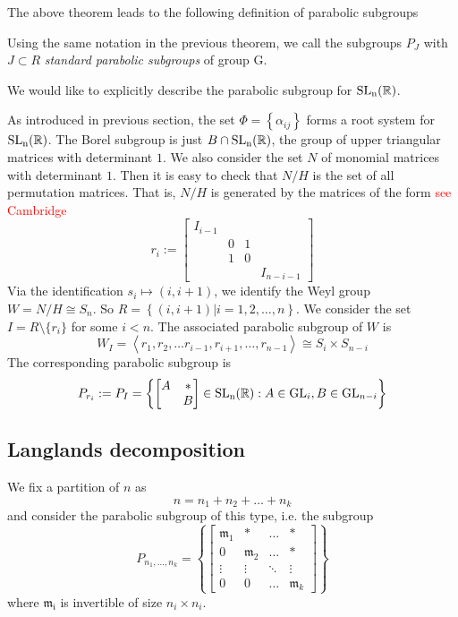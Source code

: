 The above theorem leads to the following definition of parabolic subgroups
\begin{definition}
    Using the same notation in the previous theorem, we call the subgroups $P_J$ with $J \subset R$  \textit{standard parabolic subgroups} of group G.
\end{definition}
We would like to explicitly describe the parabolic subgroup for $\operatorname{\text{SL}_n(\mathbb{R})}$.
\begin{example}
    As introduced in previous section, the set $\Phi = \left\lbrace \alpha_{ij}\right\rbrace $ forms a
    root system for $\operatorname{\text{SL}_n(\mathbb{R})}$. The Borel subgroup is just $B \cap \operatorname{\text{SL}_n(\mathbb{R})}$, the group of upper triangular matrices with determinant $1$.
    We also consider the set $N$ of monomial matrices  with determinant $1$. Then it is easy to check that
    $N/H$ is the set of all permutation matrices. That is, $N/H$ is generated by the
    matrices of the form \textcolor{red}{see Cambridge}
    \[r_i := \begin{bmatrix}
            I_{i-1} &   &   &           \\
                    & 0 & 1 &           \\
                    & 1 & 0 &           \\
                    &   &   & I_{n-i-1}
        \end{bmatrix}\]
    Via the identification $s_i \mapsto (i,i+1)$, we identify  the Weyl group $W = N/H \cong S_n$. So
    $R = \left\lbrace (i,i+1)| i = 1,2,\ldots,n\right\rbrace $. We consider the set
    $I = R \setminus \{r_i\}$ for some $i<n$. The associated parabolic subgroup of
    $W$ is
    \[W_I = \left\langle r_1,r_2,\ldots r_{i-1},r_{i+1},\ldots, r_{n-1} \right\rangle \cong
        S_i \times S_{n-i}\]
    The corresponding parabolic subgroup is
    \[P_{r_i} := P_I = \left\lbrace \begin{bmatrix}
            A & \ast \\
              & B
        \end{bmatrix} \in \operatorname{\text{SL}_n(\mathbb{R})}: A \in \text{GL}_i, B \in \text{GL}_{n-i}\right\rbrace \]
\end{example}

\subsection{Langlands decomposition}
We fix a partition of $n$ as
\[n=n_1+n_2+\ldots+n_k\]
and consider the parabolic subgroup of this type, i.e. the subgroup
\[P_{n_1,\ldots, n_k} = \left\lbrace \begin{bmatrix}
        \mathfrak{m}_1 & \ast           & \ldots & \ast           \\
        0              & \mathfrak{m}_2 & \ldots & \ast           \\
        \vdots         & \vdots         & \ddots & \vdots         \\
        0              & 0              & \ldots & \mathfrak{m}_k
    \end{bmatrix} \right\rbrace\]
where $\mathfrak{m_i}$ is invertible of size $n_i \times n_i$.

